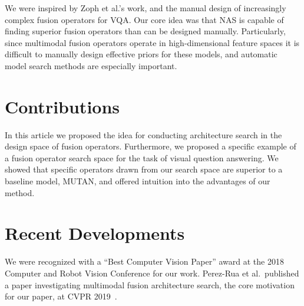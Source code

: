 We were inspired by Zoph et al.'s work, and the manual design of increasingly
complex fusion operators for VQA.
Our core idea was that NAS is capable of finding superior fusion operators than
can be designed manually.
Particularly, since multimodal fusion operators operate in high-dimensional
feature spaces it is difficult to manually design effective priors for these
models, and automatic model search methods are especially important.


\section{Contributions}

In this article we proposed the idea for conducting architecture search in the
design space of fusion operators.
Furthermore, we proposed a specific example of a fusion operator search space
for the task of visual question answering.
We showed that specific operators drawn from our search space are superior to a
baseline model, MUTAN, and offered intuition into the advantages of our method.


\section{Recent Developments}

We were recognized with a ``Best Computer Vision Paper'' award at the 2018
Computer and Robot Vision Conference for our work.
Perez-Rua et al.\ published a paper investigating multimodal fusion architecture
search, the core motivation for our paper, at CVPR
2019~\cite{Perez-Rua2019mfas}.
